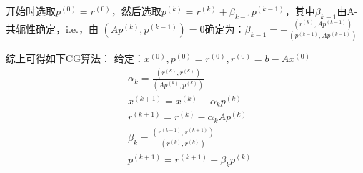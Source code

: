 \documentclass[a4paper]{article}
\begin{document}
开始时选取$p^{(0)}=r^{(0)}$，然后选取$p^{(k)}=r^{(k)}+\beta_{k-1}p^{(k-1)} $，其中$\beta_{k-1} $由A-共轭性确定，i.e.，由
$(Ap^{(k)}, p^{(k-1)})=0$确定为：$\beta_{k-1}=-\frac{(r^{(k)}, Ap^{(k-1)})}{(p^{(k-1)}, Ap^{(k-1)})} $

综上可得如下CG算法：
给定：$x^{(0)},p^{(0)}=r^{(0)}, r^{(0)}=b-Ax^{(0)} $
\begin{align}
  &\alpha_k = \frac{(r^{(k)}, r^{(k)})}{(Ap^{(k)}, p^{(k)})} \\
  &x^{(k+1)}=x^{(k)}+\alpha_k p^{(k)}  \\
  &r^{(k+1)}=r^{(k)}-\alpha_kAp^{(k)}\\
  &\beta_k = \frac{(r^{(k+1)}, r^{(k+1)})}{(r^{(k)}, r^{(k)})} \\
  &p^{(k+1)}=r^{(k+1)}+\beta_k p^{(k)}
\end{align}
\end{document}
